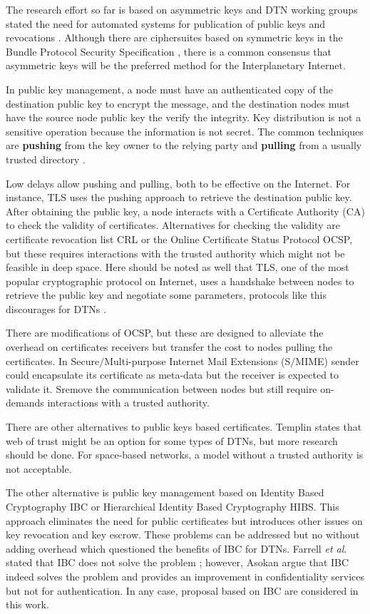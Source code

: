 The research effort so far is based on asymmetric keys and DTN working groups stated the need for automated systems for publication of public keys and revocations \cite{templin-dtnskmps-00}. Although there are ciphersuites based on symmetric keys in the Bundle Protocol Security Specification \cite{ietf-dtn-bpsec-07}, there is a common consensus that asymmetric keys will be the preferred method for the Interplanetary Internet. 

In public key management, a node must have an authenticated copy of the destination public key to encrypt the message, and the destination nodes must have the source node public key the verify the integrity. Key distribution is not a sensitive operation because the information is not secret. The common techniques are \textbf{pushing} from the key owner to the relying party and \textbf{pulling} from a usually trusted directory \cite{martineveryday}.

Low delays allow pushing and pulling, both to be effective on the Internet. For instance, TLS uses the pushing approach to retrieve the destination public key. After obtaining the public key, a node interacts with a Certificate Authority (CA) to check the validity of certificates. Alternatives for checking the validity are certificate revocation list CRL or the Online Certificate Status Protocol OCSP, but these requires interactions with the trusted authority which might not be feasible in deep space. Here should be noted as well that TLS, one of the most popular cryptographic protocol on Internet, uses a handshake between nodes to retrieve the public key and negotiate some parameters, protocols like this discourages for DTNs \cite{fall2003delay}.

There are modifications of OCSP, but these are designed to alleviate the overhead on certificates receivers but transfer the cost to nodes pulling the certificates. In Secure$/$Multi-purpose Internet Mail Extensions (S$/$MIME) sender could encapsulate its certificate as meta-data but the receiver is expected to validate it. S\MIME remove the communication between nodes but still require on-demands interactions with a trusted authority.

There are other alternatives to public keys based certificates. Templin \cite{templin-dtnskmps-00} states that web of trust might be an option for some types of DTNs, but more research should be done. For space-based networks, a model without a trusted authority is not acceptable. 

The other alternative is public key management based on Identity Based Cryptography IBC or Hierarchical Identity Based Cryptography HIBS. This approach eliminates the need for public certificates but introduces other issues on key revocation and key escrow. These problems can be addressed but no without adding overhead which questioned the benefits of IBC for DTNs. Farrell \textit{et al}. stated that IBC does not solve the problem \cite{irtf-dtnrg-sec-overview-06}; however, Asokan \cite{asokan2007towards} argue that IBC indeed solves the problem and provides an improvement in confidentiality services but not for authentication. In any case, proposal based on IBC are considered in this work.      


